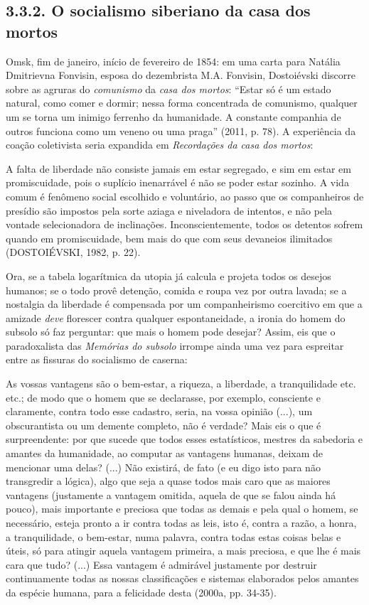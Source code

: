\subsection{3.3.2. O socialismo siberiano da casa dos mortos}

Omsk, fim de janeiro, início de fevereiro de 1854: em uma carta para
Natália Dmitrievna Fonvisin, esposa do dezembrista M.A. Fonvisin,
Dostoiévski discorre sobre as agruras do \emph{comunismo} da \emph{casa
dos mortos}: ``Estar só é um estado natural, como comer e dormir; nessa
forma concentrada de comunismo, qualquer um se torna um inimigo ferrenho
da humanidade. A constante companhia de outros funciona como um veneno
ou uma praga'' (2011, p. 78). A experiência da coação coletivista seria
expandida em \emph{Recordações da casa dos mortos}:

A falta de liberdade não consiste jamais em estar segregado, e sim em
estar em promiscuidade, pois o suplício inenarrável é não se poder estar
sozinho. A vida comum é fenômeno social escolhido e voluntário, ao passo
que os companheiros de presídio são impostos pela sorte aziaga e
niveladora de intentos, e não pela vontade selecionadora de inclinações.
Inconscientemente, todos os detentos sofrem quando em promiscuidade, bem
mais do que com seus devaneios ilimitados (DOSTOIÉVSKI, 1982, p. 22).

Ora, se a tabela logarítmica da utopia já calcula e projeta todos os
desejos humanos; se o todo provê detenção, comida e roupa vez por outra
lavada; se a nostalgia da liberdade é compensada por um companheirismo
coercitivo em que a amizade \emph{deve} florescer contra qualquer
espontaneidade, a ironia do homem do subsolo só faz perguntar: que mais
o homem pode desejar? Assim, eis que o paradoxalista das \emph{Memórias
do subsolo} irrompe ainda uma vez para espreitar entre as fissuras do
socialismo de caserna:

As vossas vantagens são o bem-estar, a riqueza, a liberdade, a
tranquilidade etc. etc.; de modo que o homem que se declarasse, por
exemplo, consciente e claramente, contra todo esse cadastro, seria, na
vossa opinião (...), um obscurantista ou um demente completo, não é
verdade? Mais eis o que é surpreendente: por que sucede que todos esses
estatísticos, mestres da sabedoria e amantes da humanidade, ao computar
as vantagens humanas, deixam de mencionar uma delas? (...) Não existirá,
de fato (e eu digo isto para não transgredir a lógica), algo que seja a
quase todos mais caro que as maiores vantagens (justamente a vantagem
omitida, aquela de que se falou ainda há pouco), mais importante e
preciosa que todas as demais e pela qual o homem, se necessário, esteja
pronto a ir contra todas as leis, isto é, contra a razão, a honra, a
tranquilidade, o bem-estar, numa palavra, contra todas estas coisas
belas e úteis, só para atingir aquela vantagem primeira, a mais
preciosa, e que lhe é mais cara que tudo? (...) Essa vantagem é
admirável justamente por destruir continuamente todas as nossas
classificações e sistemas elaborados pelos amantes da espécie humana,
para a felicidade desta (2000a, pp. 34-35).

